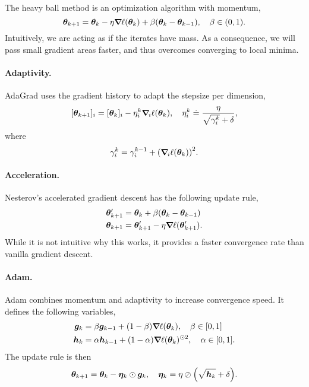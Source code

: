 The heavy ball method is an optimization algorithm with momentum, \[
    \vec{\theta}_{k+1} = \vec{\theta}_k - \eta \grad{\ell(\vec{\theta}_k)}{} + \beta (\vec{\theta}_k - \vec{\theta}_{k-1}), \quad \beta \in (0,1).
\]
Intuitively, we are acting as if the iterates have mass. As a consequence, we will pass small
gradient areas faster, and thus overcomes converging to local minima.

\paragraph{Adaptivity.}

AdaGrad uses the gradient history to adapt the stepsize per dimension, \[
    [\vec{\theta}_{k+1}]_i = [\vec{\theta}_k]_i - \eta_i^k \grad{\ell(\vec{\theta}_k)}{i}, \quad \eta_i^k \doteq \frac{\eta}{\sqrt{\gamma_i^k} + \delta},
\]
where \[
    \gamma_i^k = \gamma_i^{k-1} + \lft( \grad{\ell(\vec{\theta}_k)}{i} \rgt)^2.
\]

\paragraph{Acceleration.}

Nesterov's accelerated gradient descent has the following update rule,
\begin{align*}
    \vec{\theta}_{k+1}' & = \vec{\theta}_k + \beta (\vec{\theta}_k - \vec{\theta}_{k-1})   \\
    \vec{\theta}_{k+1}  & = \vec{\theta}_{k+1}' - \eta \grad{\ell(\vec{\theta}_{k+1}')}{}.
\end{align*}
While it is not intuitive why this works, it provides a faster convergence rate than vanilla gradient
descent.

\paragraph{Adam.}

Adam combines momentum and adaptivity to increase convergence speed. It defines the following
variables,
\begin{align*}
    \vec{g}_k & = \beta \vec{g}_{k-1} + (1- \beta) \grad{\ell(\vec{\theta}_k)}{}, \quad \beta \in [0,1]              \\
    \vec{h}_k & = \alpha \vec{h}_{k-1} + (1-\alpha) \grad{\ell(\vec{\theta}_k)}{}^{\odot 2}, \quad \alpha \in [0,1].
\end{align*}
The update rule is then \[
    \vec{\theta}_{k+1} = \vec{\theta}_k - \vec{\eta}_k \odot \vec{g}_k, \quad \vec{\eta}_k = \eta \oslash \lft( \sqrt{\vec{h}_k} + \delta \rgt).
\]

